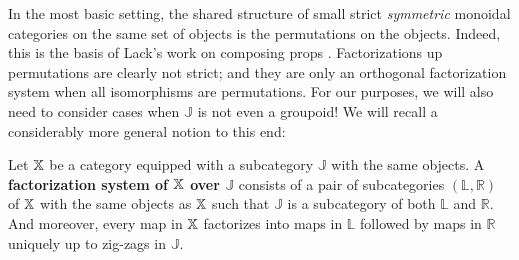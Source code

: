  In the most basic setting, the shared structure of small strict {\em symmetric} monoidal categories on the same set of objects is the permutations on the objects.  Indeed, this is the basis of Lack's work on composing props \cite{lack}. Factorizations up permutations are clearly not strict; and they are only an orthogonal factorization system when all isomorphisms are permutations.  For our purposes, we will also need to consider cases when $\mathbb J$ is not even a groupoid!  We will recall a considerably more general notion to this end:
\begingroup
\allowdisplaybreaks
\begin{definition}
\label{def:zigza}
Let $\mathbb{X}$ be a category equipped with a subcategory $\mathbb J$ with the same objects.
A {\bf factorization system of $\mathbb{X}$ over $\mathbb J$} consists of a pair of subcategories $(\mathbb L,\mathbb R)$ of $\mathbb{X}$ with the same objects as $\mathbb{X}$ such that $\mathbb J$ is a subcategory of both $\mathbb L$ and $\mathbb R$.  And moreover, every map in $\mathbb{X}$ factorizes into maps in $\mathbb L$ followed by maps in $\mathbb R$ uniquely up to zig-zags in $\mathbb J$.


\end{definition}

